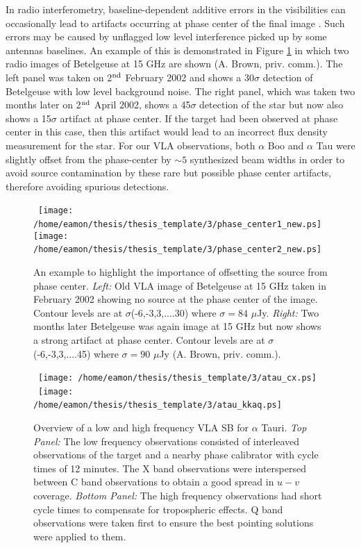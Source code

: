 In radio interferometry, baseline-dependent additive errors in the visibilities can occasionally lead to artifacts occurring at phase center of the final image \citep{ekers_1982}. Such errors may be caused by unflagged low level interference picked up by some antennas baselines. An example of this is demonstrated in Figure \ref{fig:3.6} in which two radio images of Betelgeuse at 15 GHz are shown (A. Brown, priv. comm.). The left panel was taken on 2$^{\rm{nd}}$ February 2002 and shows a 30$\sigma$ detection of Betelgeuse with low level background noise. The right panel, which was taken two months later on 2$^{\rm{nd}}$ April 2002, shows a 45$\sigma$ detection of the star but now also shows a 15$\sigma$ artifact at phase center. If the target had been observed at phase center in this case, then this artifact would lead to an incorrect flux density measurement for the star. For our VLA observations, both $\alpha$ Boo and $\alpha$ Tau were slightly offset from the phase-center by $\sim 5$ synthesized beam widths in order to avoid source contamination by these rare but possible phase center artifacts, therefore avoiding spurious detections. 

\begin{figure}[hbt!]
\centering 
\mbox{
          \texttt{[image: /home/eamon/thesis/thesis\_template/3/phase\_center1\_new.ps]}
          \texttt{[image: /home/eamon/thesis/thesis\_template/3/phase\_center2\_new.ps]}
          }
\caption[Importance of offsetting source from phase center]{An example to highlight the importance of offsetting the source from phase center. \textit{Left:} Old VLA image of Betelgeuse at 15 GHz taken in February 2002 showing no source at the phase center of the image. Contour levels are at $\sigma$(-6,-3,3,....30) where $\sigma = 84$ $\mu$Jy. \textit{Right:} Two months later Betelgeuse was again image at 15 GHz but now shows a strong artifact at phase center. Contour levels are at $\sigma$(-6,-3,3,....45) where $\sigma = 90$ $\mu$Jy (A. Brown, priv. comm.).}
\label{fig:3.6}
\end{figure}

\begin{figure}[ht!]
\centering 
\mbox{
          \texttt{[image: /home/eamon/thesis/thesis\_template/3/atau\_cx.ps]}}
\mbox{
          \texttt{[image: /home/eamon/thesis/thesis\_template/3/atau\_kkaq.ps]}
          }
\caption[Overview of a low and high frequency VLA observation]{Overview of a low and high frequency VLA SB for $\alpha$ Tauri. \textit{Top Panel:} The low frequency observations consisted of interleaved
observations of the target and a nearby phase calibrator with cycle times of 12 minutes. The X band observations were interspersed between C band observations to obtain a good spread in $u-v$ coverage. \textit{Bottom Panel:} The high frequency observations had short cycle times to compensate for tropospheric effects. Q band observations were taken first to ensure the best pointing solutions were applied to them. }
\label{fig:3.7}
\end{figure}

